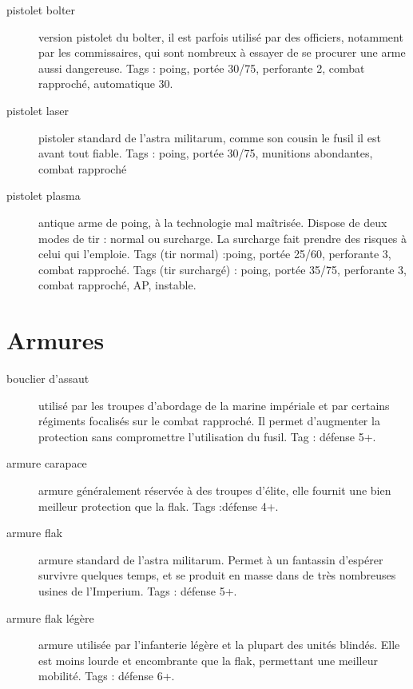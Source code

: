 \documentclass[10pt,a4paper]{article}
\begin{document}
\begin{description}
\item[pistolet bolter]version pistolet du bolter, il est parfois utilisé par des officiers, notamment par les commissaires, qui sont nombreux à essayer de se procurer une arme aussi dangereuse. Tags : poing, portée 30/75, perforante 2, combat rapproché, automatique 30.
\item[pistolet laser] pistoler standard de l'astra militarum, comme son cousin le fusil il est avant tout fiable. Tags : poing, portée 30/75, munitions abondantes, combat rapproché
\item[pistolet plasma]antique arme de poing, à la technologie mal maîtrisée. Dispose de deux modes de tir : normal ou surcharge. La surcharge fait prendre des risques à celui qui l'emploie. Tags (tir normal) :poing, portée 25/60, perforante 3, combat rapproché. Tags (tir surchargé) : poing, portée 35/75, perforante 3, combat rapproché, AP, instable.
\end{description}

\section{Armures}
\begin{description}
\item[bouclier d'assaut]utilisé par les troupes d'abordage de la marine impériale et par certains régiments focalisés sur le combat rapproché. Il permet d'augmenter la protection sans compromettre l'utilisation du fusil. Tag : défense 5+.
\item[armure carapace ]armure généralement réservée à des troupes d'élite, elle fournit une bien meilleur protection que la flak. Tags :défense 4+.
\item[armure flak]armure standard de l'astra militarum. Permet à un fantassin d'espérer survivre quelques temps, et se produit en masse dans de très nombreuses usines de l'Imperium. Tags : défense 5+.
\item[armure flak légère]armure utilisée par l'infanterie légère et la plupart des unités blindés. Elle est moins lourde et encombrante que la flak, permettant une meilleur mobilité. Tags : défense 6+.
\end{description}
\end{document}
